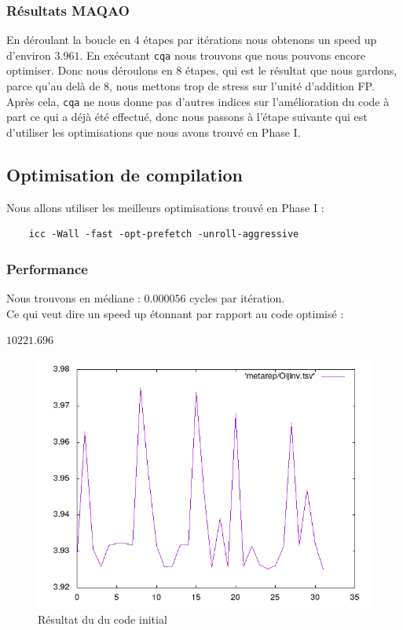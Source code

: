 \documentclass{report}
\begin{document}
  \subsubsection{Résultats MAQAO}
  En déroulant la boucle en 4 étapes par itérations nous obtenons un speed up d'environ $3.961$.
  En exécutant \texttt{cqa} nous trouvons que nous pouvons encore optimiser. Donc nous déroulons
  en 8 étapes, qui est le résultat que nous gardons, parce qu'au delà de 8, nous mettons trop de
  stress sur l'unité d'addition FP.
  Après cela, \texttt{cqa} ne nous donne pas d'autres indices sur l'amélioration du code à part ce
  qui a déjà été effectué, donc nous passons à l'étape suivante qui est d'utiliser les optimisations
  que nous avons trouvé en Phase I.

  \subsection{Optimisation de compilation}
  Nous allons utiliser les meilleurs optimisations trouvé en Phase I :
  \begin{verbatim}
    icc -Wall -fast -opt-prefetch -unroll-aggressive
  \end{verbatim}
  \subsubsection{Performance}
  Nous trouvons en médiane : $0.000056$ cycles par itération.\\
  Ce qui veut dire un speed up étonnant par rapport au code optimisé :
  \begin{center}
      $10221.696$
  \end{center}
  \begin{figure}[ht!]
    \centering
    \includegraphics[scale=0.45]{../metarep/Oijinv.png}
    \caption{Résultat du du code initial}
  \end{figure}
\end{document}
